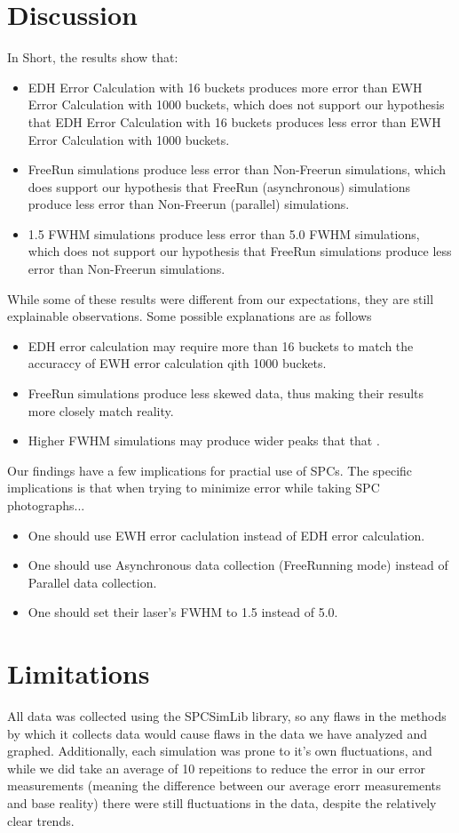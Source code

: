 \documentclass{article}
\begin{document}
\section*{Discussion}
In Short, the results show that:
\begin{itemize}
  \item EDH Error Calculation with 16 buckets produces more error than EWH Error Calculation with 1000 buckets, which does not support our hypothesis that EDH Error Calculation with 16 buckets produces less error than EWH Error Calculation with 1000 buckets.
  \item FreeRun simulations produce less error than Non-Freerun simulations, which does support our hypothesis that FreeRun (asynchronous) simulations produce less error than Non-Freerun (parallel) simulations.
  \item 1.5 FWHM simulations produce less error than 5.0 FWHM simulations, which does not support our hypothesis that FreeRun simulations produce less error than Non-Freerun simulations.
\end{itemize}
While some of these results were different from our expectations, they are still explainable observations. Some possible explanations are as follows
\begin{itemize}
  \item EDH error calculation may require more than 16 buckets to match the accuraccy of EWH error calculation qith 1000 buckets.
  \item FreeRun simulations produce less skewed data, thus making their results more closely match reality.
  \item Higher FWHM simulations may produce wider peaks that that .
\end{itemize}
Our findings have a few implications for practial use of SPCs. The specific implications is that when trying to minimize error while taking SPC photographs...
\begin{itemize}
  \item One should use EWH error caclulation instead of EDH error calculation.
  \item One should use Asynchronous data collection (FreeRunning mode) instead of Parallel data collection.
  \item One should set their laser's FWHM to 1.5 instead of 5.0.
\end{itemize}

\section*{Limitations}
All data was collected using the SPCSimLib library, so any flaws in the methods by which it collects data would cause flaws in the data we have analyzed and graphed. Additionally, each simulation was prone to it's own fluctuations, and while we did take an average of 10 repeitions to reduce the error in our error measurements (meaning the difference between our average erorr measurements and base reality) there were still fluctuations in the data, despite the relatively clear trends.
\end{document}

